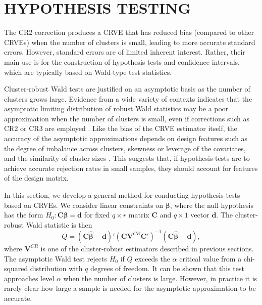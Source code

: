 \documentclass[12pt]{article}\usepackage[]{graphicx}\usepackage[]{color}
\newcommand{\bm}{\mathbf}
\newcommand{\bs}{\boldsymbol}
\begin{document}
\section{HYPOTHESIS TESTING}
\label{sec:testing}

The CR2 correction produces a CRVE that has reduced bias (compared to other CRVEs) when the number of clusters is small, leading to more accurate standard errors. However, standard errors are of limited inherent interest. Rather, their main use is for the construction of hypothesis tests and confidence intervals, which are typically based on Wald-type test statistics.

Cluster-robust Wald tests are justified on an asymptotic basis as the number of clusters grows large. 
Evidence from a wide variety of contexts indicates that the asymptotic limiting distribution of robust Wald statistics may be a poor approximation when the number of clusters is small, even if corrections such as CR2 or CR3 are employed \citep{Bell2002bias, Bertrand2004how, Cameron2008bootstrap}. 
Like the bias of the CRVE estimator itself, the accuracy of the asymptotic approximations depends on design features such as the degree of imbalance across clusters, skewness or leverage of the covariates, and the similarity of cluster sizes \citep[][]{McCaffrey2001generalizations, MacKinnon2016wild, Carter2013asymptotic}. 
This suggests that, if hypothesis tests are to achieve accurate rejection rates in small samples, they should account for features of the design matrix.

In this section, we develop a general method for conducting hypothesis tests based on CRVEs. We consider linear constraints on $\bs\beta$, where the null hypothesis has the form $H_0: \bm{C}\bs\beta = \bm{d}$ for fixed $q \times r$ matrix $\bm{C}$ and $q \times 1$ vector $\bm{d}$. 
The cluster-robust Wald statistic is then
\begin{equation}
\label{eq:Wald_stat}
Q = \left(\bm{C}\bs{\hat\beta} - \bm{d}\right)'\left(\bm{C} \bm{V}^{CR} \bm{C}'\right)^{-1}\left(\bm{C}\bs{\hat\beta} - \bm{d}\right),
\end{equation}
where $\bm{V}^{CR}$ is one of the cluster-robust estimators described in previous sections. 
The asymptotic Wald test rejects $H_0$ if $Q$ exceeds the $\alpha$ critical value from a chi-squared distribution with $q$ degrees of freedom. 
It can be shown that this test approaches level $\alpha$ when the number of clusters is large. 
However, in practice it is rarely clear how large a sample is needed for the asymptotic approximation to be accurate. 
\end{document}
